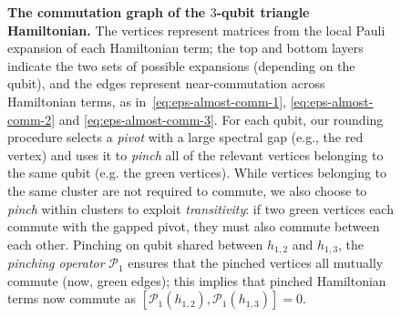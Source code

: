 \documentclass[11pt]{article}
\theoremstyle{plain}
\renewcommand{\C}{\mathbb{C}}
\begin{document}
\begin{figure}[t]

    \caption{\textbf{The commutation graph of the $3$-qubit triangle Hamiltonian.} 
    The vertices represent matrices from the local Pauli expansion of each Hamiltonian term;
the top and bottom layers indicate the two sets of possible expansions 
(depending on the qubit), and the edges represent near-commutation 
across Hamiltonian terms, as in~\eqref{eq:eps-almost-comm-1}, 
\eqref{eq:eps-almost-comm-2} and \eqref{eq:eps-almost-comm-3}. For each 
qubit, our rounding procedure selects a \emph{pivot} with a large 
spectral gap (e.g., the red vertex) and uses it to \emph{pinch} all of 
the relevant vertices belonging to the same qubit (e.g. the green 
vertices). While vertices belonging to the same cluster are not 
required to 
commute, we also choose to \emph{pinch} within clusters to exploit 
\emph{transitivity}: if two green vertices each commute with the gapped 
pivot, they must also commute between each other. Pinching on qubit 
shared between $h_{1,2}$ and $h_{1,3}$, the \emph{pinching operator} 
$\mathcal{P}_1$ ensures that the pinched vertices all mutually commute 
(now, green edges); this implies that 
 pinched Hamiltonian terms now commute as $[\mathcal{P}_1(h_{1,2}),\mathcal{P}_1(h_{1,3})]=0$.
 }\label{fig:triangle-Hamiltinonian-rounding}
\end{figure}
\end{document}

